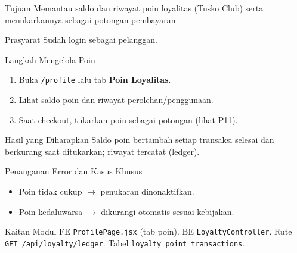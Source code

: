 
\begin{flowsection}{Tujuan}
Memantau saldo dan riwayat poin loyalitas (Tusko Club) serta menukarkannya
sebagai potongan pembayaran.
\end{flowsection}

\begin{flowsection}{Prasyarat}
Sudah login sebagai pelanggan.
\end{flowsection}

\begin{flowsection}{Langkah Mengelola Poin}
\begin{enumerate}
  \item Buka \texttt{/profile} lalu tab \textbf{Poin Loyalitas}.
  \item Lihat saldo poin dan riwayat perolehan/penggunaan.
  \item Saat checkout, tukarkan poin sebagai potongan (lihat P11).
\end{enumerate}
\end{flowsection}


\begin{flowsection}{Hasil yang Diharapkan}
Saldo poin bertambah setiap transaksi selesai dan berkurang saat ditukarkan;
riwayat tercatat (ledger).
\end{flowsection}

\begin{flowsection}{Penanganan Error dan Kasus Khusus}
\begin{itemize}
  \item Poin tidak cukup $\rightarrow$ penukaran dinonaktifkan.
  \item Poin kedaluwarsa $\rightarrow$ dikurangi otomatis sesuai kebijakan.
\end{itemize}
\end{flowsection}

\begin{flowsection}{Kaitan Modul}
FE \texttt{ProfilePage.jsx} (tab poin). BE \texttt{LoyaltyController}. Rute
\texttt{GET /api/loyalty/ledger}. Tabel \texttt{loyalty\_point\_transactions}.
\end{flowsection}

